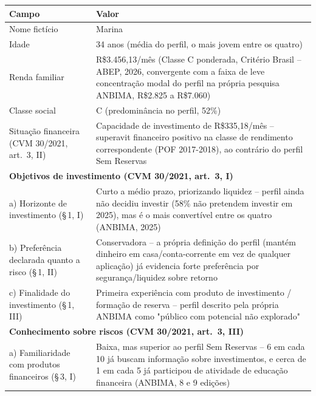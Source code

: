 \begin{quadro}[htbp]
  \centering
  \small
  \caption{Persona 2 -- Perfil Economiza e N\~ao Investe (12\% da popula\c{c}\~ao)}
  \label{qua:persona-economiza}
  \begin{tabular}{p{5cm}p{8cm}}
    \toprule
    \textbf{Campo} & \textbf{Valor} \\
    \midrule
    Nome fict\'icio & Marina \\
    Idade & 34 anos (m\'edia do perfil, o mais jovem entre os quatro) \\
    Renda familiar & R\$3.456,13/m\^es (Classe C ponderada, Crit\'erio Brasil -- ABEP, 2026, convergente com a faixa de leve concentra\c{c}\~ao modal do perfil na pr\'opria pesquisa ANBIMA, R\$2.825 a R\$7.060) \\
    Classe social & C (predomin\^ancia no perfil, 52\%) \\
    Situa\c{c}\~ao financeira (CVM 30/2021, art.\ 3\textordmasculine{}, II) & Capacidade de investimento de R\$335,18/m\^es -- superavit financeiro positivo na classe de rendimento correspondente (POF 2017-2018), ao contr\'ario do perfil Sem Reservas \\
    \multicolumn{2}{l}{\textbf{Objetivos de investimento (CVM 30/2021, art.\ 3\textordmasculine{}, I)}} \\
    \quad a) Horizonte de investimento (\S\,1\textordmasculine{}, I) & Curto a m\'edio prazo, priorizando liquidez -- perfil ainda n\~ao decidiu investir (58\% n\~ao pretendem investir em 2025), mas \'e o mais convert\'ivel entre os quatro (ANBIMA, 2025) \\
    \quad b) Prefer\^encia declarada quanto a risco (\S\,1\textordmasculine{}, II) & Conservadora -- a pr\'opria defini\c{c}\~ao do perfil (mant\'em dinheiro em casa/conta-corrente em vez de qualquer aplica\c{c}\~ao) j\'a evidencia forte prefer\^encia por seguran\c{c}a/liquidez sobre retorno \\
    \quad c) Finalidade do investimento (\S\,1\textordmasculine{}, III) & Primeira experi\^encia com produto de investimento / forma\c{c}\~ao de reserva -- perfil descrito pela pr\'opria ANBIMA como "p\'ublico com potencial n\~ao explorado" \\
    \multicolumn{2}{l}{\textbf{Conhecimento sobre riscos (CVM 30/2021, art.\ 3\textordmasculine{}, III)}} \\
    \quad a) Familiaridade com produtos financeiros (\S\,3\textordmasculine{}, I) & Baixa, mas superior ao perfil Sem Reservas -- 6 em cada 10 j\'a buscam informa\c{c}\~ao sobre investimentos, e cerca de 1 em cada 5 j\'a participou de atividade de educa\c{c}\~ao financeira (ANBIMA, 8\textordmasculine{} e 9\textordmasculine{} edi\c{c}\~oes) \\

\end{tabular}
\end{quadro}
